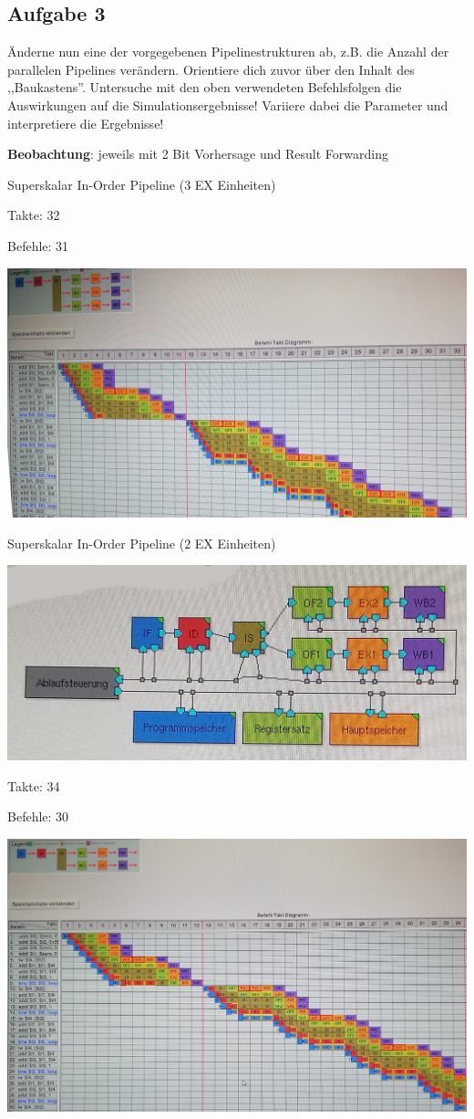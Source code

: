 \documentclass[a4paper,12pt,titlepage]{scrartcl}
\begin{document}
\subsection*{Aufgabe 3}
Änderne nun eine der vorgegebenen Pipelinestrukturen ab, z.B. die Anzahl der parallelen Pipelines verändern. Orientiere dich zuvor über den Inhalt des ,,Baukastens''. Untersuche mit den oben verwendeten Befehlsfolgen die Auswirkungen auf die Simulationsergebnisse! Variiere dabei die Parameter und interpretiere die Ergebnisse!

\textbf{Beobachtung}: jeweils mit 2 Bit Vorhersage und Result Forwarding
\begin{itemize*}
    \item Superskalar In-Order Pipeline (3 EX Einheiten)
    \begin{itemize*}
        \item Takte: 32
        \item Befehle: 31
        \item \includegraphics[width=.4\linewidth]{Assets/RA2-65225.jpg}
    \end{itemize*}
    \item Superskalar In-Order Pipeline (2 EX Einheiten)
    \begin{itemize*}
        \item \includegraphics[width=.4\linewidth]{Assets/RA2-65346.jpg}
        \item Takte: 34
        \item Befehle: 30
        \item \includegraphics[width=.4\linewidth]{Assets/RA2-65517.jpg}

\end{itemize*}
\end{itemize*}
\end{document}
